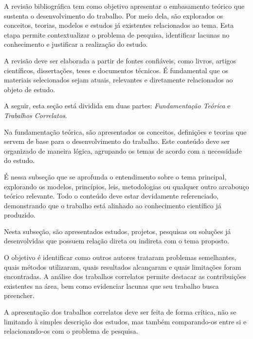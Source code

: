 A revisão bibliográfica tem como objetivo apresentar o embasamento teórico que sustenta o desenvolvimento do trabalho. Por meio dela, são explorados os conceitos, teorias, modelos e estudos já existentes relacionados ao tema. Esta etapa permite contextualizar o problema de pesquisa, identificar lacunas no conhecimento e justificar a realização do estudo.

A revisão deve ser elaborada a partir de fontes confiáveis, como livros, artigos científicos, dissertações, teses e documentos técnicos. É fundamental que os materiais selecionados sejam atuais, relevantes e diretamente relacionados ao objeto de estudo.

A seguir, esta seção está dividida em duas partes: \textit{Fundamentação Teórica} e \textit{Trabalhos Correlatos}.


Na fundamentação teórica, são apresentados os conceitos, definições e teorias que servem de base para o desenvolvimento do trabalho. Este conteúdo deve ser organizado de maneira lógica, agrupando os temas de acordo com a necessidade do estudo.

É nessa subseção que se aprofunda o entendimento sobre o tema principal, explorando os modelos, princípios, leis, metodologias ou qualquer outro arcabouço teórico relevante. Todo o conteúdo deve estar devidamente referenciado, demonstrando que o trabalho está alinhado ao conhecimento científico já produzido.


Nesta subseção, são apresentados estudos, projetos, pesquisas ou soluções já desenvolvidas que possuem relação direta ou indireta com o tema proposto.

O objetivo é identificar como outros autores trataram problemas semelhantes, quais métodos utilizaram, quais resultados alcançaram e quais limitações foram encontradas. A análise dos trabalhos correlatos permite destacar as contribuições existentes na área, bem como evidenciar lacunas que seu trabalho busca preencher.

A apresentação dos trabalhos correlatos deve ser feita de forma crítica, não se limitando à simples descrição dos estudos, mas também comparando-os entre si e relacionando-os com o problema de pesquisa.